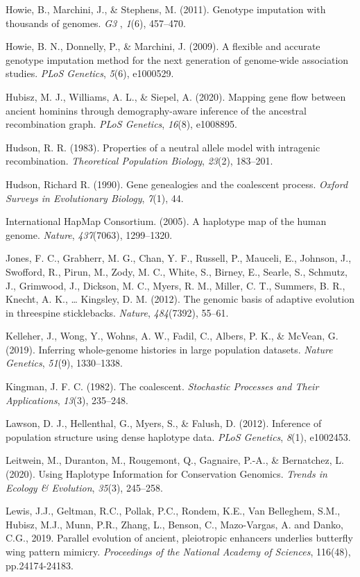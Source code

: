 \documentclass[twocolumn]{bmcart}%
\begin{document}
\begin{backmatter}
Howie, B., Marchini, J., \& Stephens, M. (2011). Genotype imputation
with thousands of genomes. \emph{G3} , \emph{1}(6), 457--470.

Howie, B. N., Donnelly, P., \& Marchini, J. (2009). A flexible and
accurate genotype imputation method for the next generation of
genome-wide association studies. \emph{PLoS Genetics}, \emph{5}(6),
e1000529.

Hubisz, M. J., Williams, A. L., \& Siepel, A. (2020). Mapping gene flow
between ancient hominins through demography-aware inference of the
ancestral recombination graph. \emph{PLoS Genetics}, \emph{16}(8),
e1008895.

Hudson, R. R. (1983). Properties of a neutral allele model with
intragenic recombination. \emph{Theoretical Population Biology},
\emph{23}(2), 183--201.

Hudson, Richard R. (1990). Gene genealogies and the coalescent process.
\emph{Oxford Surveys in Evolutionary Biology}, \emph{7}(1), 44.

International HapMap Consortium. (2005). A haplotype map of the human
genome. \emph{Nature}, \emph{437}(7063), 1299--1320.

Jones, F. C., Grabherr, M. G., Chan, Y. F., Russell, P., Mauceli, E.,
Johnson, J., Swofford, R., Pirun, M., Zody, M. C., White, S., Birney,
E., Searle, S., Schmutz, J., Grimwood, J., Dickson, M. C., Myers, R. M.,
Miller, C. T., Summers, B. R., Knecht, A. K., \ldots{} Kingsley, D. M.
(2012). The genomic basis of adaptive evolution in threespine
sticklebacks. \emph{Nature}, \emph{484}(7392), 55--61.

Kelleher, J., Wong, Y., Wohns, A. W., Fadil, C., Albers, P. K., \&
McVean, G. (2019). Inferring whole-genome histories in large population
datasets. \emph{Nature Genetics}, \emph{51}(9), 1330--1338.

Kingman, J. F. C. (1982). The coalescent. \emph{Stochastic Processes and
Their Applications}, \emph{13}(3), 235--248.

Lawson, D. J., Hellenthal, G., Myers, S., \& Falush, D. (2012).
Inference of population structure using dense haplotype data. \emph{PLoS
Genetics}, \emph{8}(1), e1002453.

Leitwein, M., Duranton, M., Rougemont, Q., Gagnaire, P.-A., \&
Bernatchez, L. (2020). Using Haplotype Information for Conservation
Genomics. \emph{Trends in Ecology \& Evolution}, \emph{35}(3), 245--258.

Lewis, J.J., Geltman, R.C., Pollak, P.C., Rondem, K.E., Van Belleghem,
S.M., Hubisz, M.J., Munn, P.R., Zhang, L., Benson, C., Mazo-Vargas, A.
and Danko, C.G., 2019. Parallel evolution of ancient, pleiotropic
enhancers underlies butterfly wing pattern mimicry. \emph{Proceedings of
the National Academy of Sciences}, 116(48), pp.24174-24183.


\end{backmatter}
\end{document}
